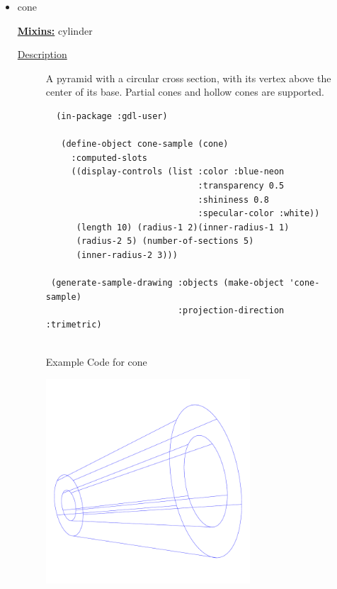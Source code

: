 \documentclass [11pt]{book}
\begin{document}
\begin{itemize}
\item {}cone


\textbf{
\underline{Mixins:}} cylinder





\begin{description}

\item [
\underline{Description}]


A pyramid with a circular cross section, with its vertex above 
the center of its base. Partial cones and hollow cones are supported.



\end{description}




\begin{figure}
\begin{lrbox}{\boxedverb}
\begin{minipage}{\linewidth}
{\small

\begin{verbatim}
  (in-package :gdl-user)

   (define-object cone-sample (cone)
     :computed-slots
     ((display-controls (list :color :blue-neon 
                              :transparency 0.5 
                              :shininess 0.8 
                              :specular-color :white))
      (length 10) (radius-1 2)(inner-radius-1 1)
      (radius-2 5) (number-of-sections 5)
      (inner-radius-2 3)))
  
 (generate-sample-drawing :objects (make-object 'cone-sample) 
                          :projection-direction :trimetric) 
  
\end{verbatim}}
\end{minipage}
\end{lrbox}
\fbox{\usebox{\boxedverb}}

\caption{Example Code for cone}

\label{fig:example-code-cone}

\end{figure}

\begin{figure}
\begin{center}
\includegraphics[width=3in,height=3in]{../images/example-cone.pdf}
\end{center}


\end{figure}
\end{itemize}
\end{document}
